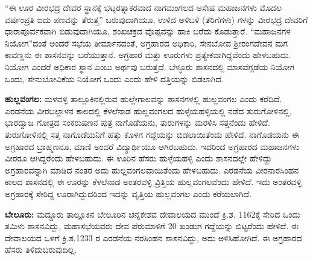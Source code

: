 “ಈ ಊರ ವೀರಭದ್ರ ದೇವರ ಸ್ಥಾನಕ್ಕೆ ಭಟ್ಟರತ್ನಾಕರವಾದ ನಾಗಮಂಗಲದ ಅಸೇಷ ಮಹಾಜನಗಳು ಮೊದಲ ವರ್ಷಂಪ್ರತಿ ಐದು ಪಣವನ್ನು ತೆರುತ್ತ” ಬರುವುದಾಗಿಯೂ, ಉಳಿದ ಅಳಿಬಳಿ (ತೆರಿಗೆಗಳು) ಗಳನ್ನು ವೀರಭದ್ರ ದೇವರಿಗೆ ಧಾರಾಪೂರ್ವಕವಾಗಿ ಬಿಡುವುದಾಗಿಯೂ, ಶಂಖಚಕ್ರದ ವೊಪ್ಪವನ್ನು ಹಾಕಿ ಬರೆದು ಕೊಡುತ್ತಾರೆ. “ಮಹಾಜನಗಳ ನಿಯೋಗ”ದಂತೆ ಅಂದರೆ ಸಭೆಯ ತೀರ್ಮಾನದಂತೆ, ಅಗ್ರಹಾರದ ಅಧಿಕಾರಿ, ಸೇನಬೋವ ಶ‍್ರೀರಂಗದೇವನ ಮಗ ಕಾವಣ್ಣನು ಈ ಶಾಸನವನ್ನು ಬರೆಯುತ್ತಾನೆ. ಅಗ್ರಹಾರ ಮತ್ತು ಊರುಗಳು ಪ್ರತ್ಯೇಕವಾಗಿದ್ದವೆಂದು ಹೇಳಬಹುದು. ನಿಯೋಗ ಎಂದರೆ ಅಧಿಕಾರ ಸ್ಥಾನ ಎಂಬು ಅರ್ಥವು ಬರುತ್ತದೆ. ಬೆಳ್ಳೂರು ಶಾಸನದಲ್ಲಿ ಮಾಸವೆಗ್ಗಡೆಯ ನಿಯೋಗ ಒಂದು, ಸೇನುಬೋವಿಕೆಯ ನಿಯೋಗ ಒಂದು ಎಂದು ಹೇಳಿ ದತ್ತಿಯನ್ನು ಬಿಡಲಾಗಿದೆ.

\vskip 2pt

\textbf{ಹುಲ್ಲವಂಗಲ:} ಮಳವಳ್ಳಿ ತಾಲ್ಲೂಕಿನಲ್ಲಿರುವ ಹುಲ್ಲೇಗಾಲವನ್ನು ಶಾಸನಗಳಲ್ಲಿ ಹುಲ್ಲವಂಗಲ ಎಂದು ಕರೆದಿದೆ. ಎರಡನೆಯ ವೀರಬಲ್ಲಾಳನ ಕಾಲದಲ್ಲಿ ಕೆಳಲೆನಾಡ ಹುಲ್ಲವಂಗಲದ ಹುಳ್ಳೆಯಹಳ್ಳಿಯಲ್ಲಿ ನಡೆದ ತುರುಗೋಳಿನಲ್ಲಿ, ಭಾರದ್ವಾಜ ಗೋತ್ರದ ಸಂಕರುಷಣನ ಪುತ್ರ ನಾಗೊಡೆಯನು, ತುರುಗಳನ್ನು ಮರಳಿಸಿ ಸತ್ತನೆಂದು ಹೇಳಿದೆ. ತುರುಗೋಳಿನಲ್ಲಿ ಸತ್ತ ನಾಗೊಡೆಯನಿಗೆ ಹತ್ತು ಕೊಳಗ ಗದ್ದೆಯನ್ನು ಬಿಡಲಾಯಿತೆಂದು ಹೇಳಿದೆ. ನಾಗೊಡಯನು ಈ ಅಗ್ರಹಾರದ ಬ್ರಾಹ್ಮಣನೂ, ಮಾಣಿ ಅಂದರೆ ವಿದ್ಯಾರ್ಥಿಯೂ ಆಗಿರಬಹುದು. ಇದರಿಂದ ಅಗ್ರಹಾರದ ಮಹಾಜನಗಳು ವೀರರೂ ಆಗಿದ್ದರೆಂದು ಹೇಳಬಹುದು. ಈ ಊರಿನ ಹೆಸರು ಹುಳ್ಳೆಯಹಳ್ಳಿ ಎಂದು ಶಾಸನದಲ್ಲೇ ಹೇಳಿದ್ದು ಅಗ್ರಹಾರವನ್ನಾಗಿ ಮಾಡಿದ ನಂತರ ಅದು ಹುಲ್ಲವಂಗಲವಾಯಿತೆಂದು ಹೇಳಬಹುದು. ಎರಡನೆಯ ವೀರನಾರಸಿಂಹನ ಕಾಲದ ಶಾಸನದಲ್ಲಿ ಈ ಊರನ್ನು ಕೆಳಲೆನಾಡ ಅಂತರವಳ್ಳಿ ವ್ರಿತ್ತಿಯ ಹುಲ್ಲವಂಗಲವೆಂದು ಹೇಳಿದೆ. ಇದು ಅಂತರವಳ್ಳಿ ಅಗ್ರಹಾರಕ್ಕೆ ಸೇರಿದ್ದ ಊರಾಗಿದ್ದುದರಿಂದ ಇದನ್ನು ವೃತ್ತಿಯ ಹುಲ್ಲವಂಗಲ ಎಂದು ಕರೆಯಲಾಗಿದೆ.

\vskip 2pt

\textbf{ಬೇಲೂರು:} ಮದ್ದೂರು ತಾಲ್ಲೂಕಿನ ಬೇಲೂರಿನ ಚನ್ನಕೇಶವ ದೇವಾಲಯದ ಮುಂದೆ ಕ್ರಿ.ಶ. 1162ಕ್ಕೆ ಸೇರಿದ ಒಂದು ತಮಿಳು ಶಾಸನವಿದ್ದು, ಮಹಾಸಭೆಯವರು ದೇವ ಪೆರುಮಾಳಿಗೆ 20 ಖಂಡುಗ ಗದ್ದೆಯನ್ನು ಬಿಟ್ಟರೆಂದು ಹೇಳಿದೆ. ಈ ದೇವಾಲಯದ ಒಳಗೆ ಕ್ರಿ.ಶ.1233 ರ ಎರಡನೆಯ ನರಸಿಂಹನ ಶಾಸನವಿದ್ದು, ಅದು ಅಳಿಸಿಹೋಗಿದೆ. ಈ ಅಗ್ರಹಾರದ ಹೆಸರು ತಿಳಿದುಬರುವುದಿಲ್ಲ.

\vskip 2pt

